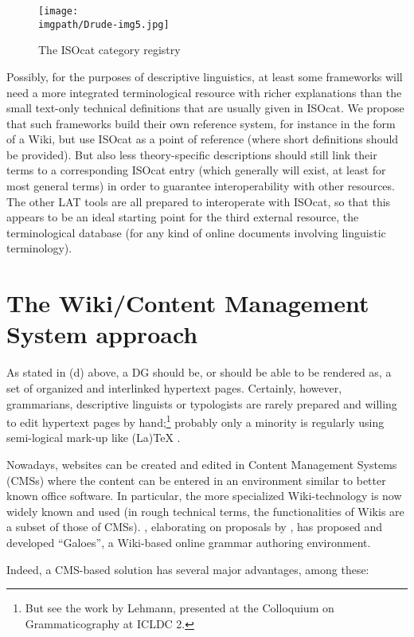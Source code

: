 \begin{figure}
\texttt{[image: \\imgpath/Drude-img5.jpg]}
\caption{The ISOcat category registry}
\end{figure}

Possibly, for the purposes of descriptive linguistics, at least some frameworks will need a more integrated terminological resource with richer explanations than the small text-only technical definitions that are usually given in ISOcat. We propose that such frameworks build their own reference system, for instance in the form of a Wiki, but use ISOcat as a point of reference (where short definitions should be provided). But also less theory-specific descriptions should still link their terms to a corresponding ISOcat entry (which generally will exist, at least for most general terms) in order to guarantee interoperability with other resources. The other LAT tools are all prepared to interoperate with ISOcat, so that this appears to be an ideal starting point for the third external resource, the terminological database (for any kind of online documents involving linguistic terminology).

\section{The Wiki/Content Management System approach} \label{drude:sec:4}

As stated in (d) above, a DG should be, or should be able to be rendered as, a set of organized and interlinked hypertext pages. Certainly, however, grammarians, descriptive linguists or typologists are rarely prepared and willing to edit hypertext pages by hand;\footnote{But 
 see the work by Lehmann, presented at the Colloquium on Grammaticography at ICLDC 2.} probably only a minority is regularly using semi-logical mark-up like (La)TeX \citep{Knuth1992}.

Nowadays, websites can be created and edited in Content Management Systems (CMSs) where the content can be entered in an environment similar to better known office software. In particular, the more specialized Wiki-technology is now widely known and used (in rough technical terms, the functionalities of Wikis are a subset of those of CMSs). \citet{Nordhoff2007tgasg,Nordhoff2007gwea,Nordhoff2007ggwg}, elaborating on proposals by \citet{Weber2006}, has proposed and developed ``Galoes'', a Wiki-based online grammar authoring environment.

Indeed, a CMS-based solution has several major advantages, among these:

